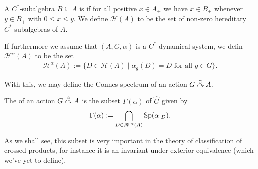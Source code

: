 \begin{definition}
	A $C^*$-subalgebra $B\subseteq A$ is  if for all positive $x \in A_+$ we have $x \in B_+$ whenever $y \in B_+$ with $0 \leq x \leq y$. We define $\mathscr{H}(A)$ to be the set of non-zero hereditary $C^*$-subalgebras of $A$. 
	
	If furthermore we assume that $(A, G, \alpha)$ is a $C^*$-dynamical system, we defin $\mathscr{H}^\alpha(A)$ to be the set
	\begin{align*}
		\mathscr{H}^\alpha (A) := \{ D \in \mathscr{H}(A) \mid \alpha_g(D)=D \text{ for all } g \in G\}.
	\end{align*}
\end{definition}

With this, we may define the Connes spectrum of an action $G \stackrel{\alpha}{\curvearrowright} A$.
\begin{definition}
	The  of an action $G \stackrel{\alpha}{\curvearrowright} A$ is the subset $\Gamma(\alpha)$ of $\hat G$ given by
	\begin{align*}
		\Gamma( \alpha) := \bigcap_{D \in \mathscr{H}^\alpha (A)} \mathrm{Sp}(\alpha|_D).	
	\end{align*}
\end{definition}
As we shall see, this subset is very important in the theory of classification of crossed products, for instance it is an invariant under exterior equivalence (which we've yet to define).
